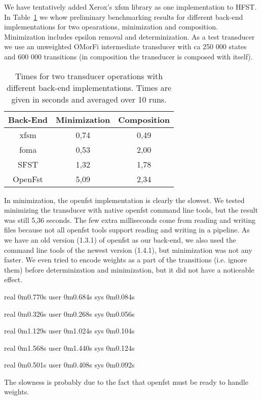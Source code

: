 \documentclass{llncs}
\begin{document}
We have tentatively added Xerox's xfsm library as one implementation to HFST.
In Table~\ref{operationtimes} we whow preliminary benchmarking results for different back-end
implementations for two opearations, minimization and composition. Minimization includes epsilon
removal and determinization.
As a test transducer we use an 
unweighted OMorFi intermediate transducer with ca 250 000 states and 600 000 transitions (in composition
the transducer is composed with itself).

\begin{table}[h!]
  \centering
  \caption{Times for two transducer operations with different back-end implementations.
    Times are given in seconds and averaged over 10 runs.}
  \begin{tabular}{c c c }
    \hline
    Back-End & Minimization & Composition \\ \hline
    xfsm & 0,74 & 0,49 \\
    foma & 0,53 & 2,00 \\
    SFST & 1,32 & 1,78 \\
    OpenFst & 5,09 & 2,34 \\ \hline
  \end{tabular}
  \label{operationtimes}
\end{table}

In minimization, the openfst implementation is clearly the slowest. We tested minimizing
the transducer with native openfst command line tools, but the result was still 5,36 seconds.
The few extra milliseconds come from reading and writing files because not all openfst tools support reading
and writing in a pipeline. As we have an old version (1.3.1) of openfst as our back-end, we also
used the command line tools of the newest version (1.4.1), but minimization was not any faster.
We even tried to encode weights as a part of the transitions (i.e. ignore them) before determinization
and minimization, but it did not have a noticeable effect.

real    0m0.770s
user    0m0.684s
sys     0m0.084s

real    0m0.326s
user    0m0.268s
sys     0m0.056s

real    0m1.129s
user    0m1.024s
sys     0m0.104s

real    0m1.568s
user    0m1.440s
sys     0m0.124s

real    0m0.501s
user    0m0.408s
sys     0m0.092s


The slowness is probably due to the fact that openfst must be ready to handle weights.
\end{document}
